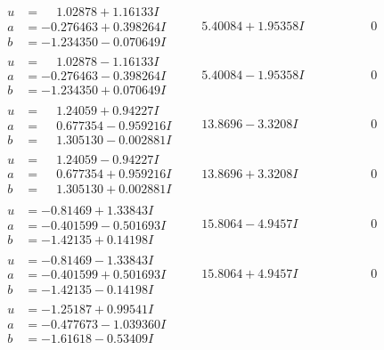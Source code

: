 \documentclass[1p]{elsarticle_modified}
\theoremstyle{definition}
\begin{document}
$$\begin{array}{c|c|c}
 \hline 
\begin{aligned}
u &= \phantom{-}1.02878 + 1.16133 I \\
a &= -0.276463 + 0.398264 I \\
b &= -1.234350 - 0.070649 I\end{aligned}
 & \phantom{-}5.40084 + 1.95358 I & \phantom{-0.000000 } 0 \\ \hline\begin{aligned}
u &= \phantom{-}1.02878 - 1.16133 I \\
a &= -0.276463 - 0.398264 I \\
b &= -1.234350 + 0.070649 I\end{aligned}
 & \phantom{-}5.40084 - 1.95358 I & \phantom{-0.000000 } 0 \\ \hline\begin{aligned}
u &= \phantom{-}1.24059 + 0.94227 I \\
a &= \phantom{-}0.677354 - 0.959216 I \\
b &= \phantom{-}1.305130 - 0.002881 I\end{aligned}
 & \phantom{-}13.8696 - 3.3208 I & \phantom{-0.000000 } 0 \\ \hline\begin{aligned}
u &= \phantom{-}1.24059 - 0.94227 I \\
a &= \phantom{-}0.677354 + 0.959216 I \\
b &= \phantom{-}1.305130 + 0.002881 I\end{aligned}
 & \phantom{-}13.8696 + 3.3208 I & \phantom{-0.000000 } 0 \\ \hline\begin{aligned}
u &= -0.81469 + 1.33843 I \\
a &= -0.401599 - 0.501693 I \\
b &= -1.42135 + 0.14198 I\end{aligned}
 & \phantom{-}15.8064 - 4.9457 I & \phantom{-0.000000 } 0 \\ \hline\begin{aligned}
u &= -0.81469 - 1.33843 I \\
a &= -0.401599 + 0.501693 I \\
b &= -1.42135 - 0.14198 I\end{aligned}
 & \phantom{-}15.8064 + 4.9457 I & \phantom{-0.000000 } 0 \\ \hline\begin{aligned}
u &= -1.25187 + 0.99541 I \\
a &= -0.477673 - 1.039360 I \\
b &= -1.61618 - 0.53409 I\end{aligned}

\end{array}$$
\end{document}

